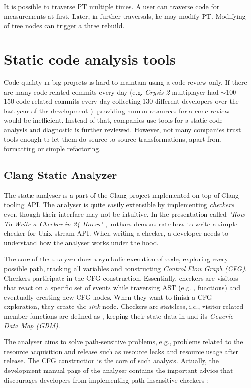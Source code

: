 It is possible to traverse PT multiple times. A user can traverse code for measurements at first. Later, in further traversals, he may modify PT. Modifying of tree nodes can trigger a three rebuild.

\section{Static code analysis tools}
Code quality in big projects is hard to maintain using a code review only. If there are many code related commits every day (e.g. \emph{Crysis 2} multiplayer had $\sim$100-150 code related commits every day collecting 130 different developers over the last year of the development \cite{crysis}), providing human resources for a code review would be inefficient. Instead of that, companies use tools for a static code analysis and diagnostic is further reviewed. However, not many companies trust tools enough to let them do source-to-source transformations, apart from formatting or simple refactoring.

\subsection{Clang Static Analyzer}
\label{clang-analyzer}
The static analyser is a part of the Clang project implemented on top of Clang tooling API. The analyser is quite easily extensible by implementing \emph{checkers}, even though their interface may not be intuitive. In the presentation called \textit{"How To Write a Checker in 24 Hours"} \cite{clang-analyzer-presentation},  authors demonstrate how to write a simple checker for  Unix stream API. When writing a checker, a developer needs to understand how the analyser works under the hood.

The core of the analyser does a symbolic execution of code, exploring every possible path, tracking all variables and constructing \emph{Control Flow Graph (CFG)}. Checkers participate in the CFG construction. Essentially, checkers are visitors that react on a specific set of events while traversing AST (e.g. ,  functions) and eventually creating new CFG nodes. When they want to finish a CFG exploration, they create the \emph{sink} node. Checkers are stateless, i.e., visitor related member functions are defined as , keeping their state data in  and its \emph{Generic Data Map (GDM)}.

The analyser aims to solve path-sensitive problems, e.g., problems related to the resource acquisition and release such as resource leaks and resource usage after release. The CFG construction is the core of such analysis. Actually, the development manual page of the analyser contains the important advice that discourages developers from implementing path-insensitive checkers \cite{clang-analyzer-manual}:\\

